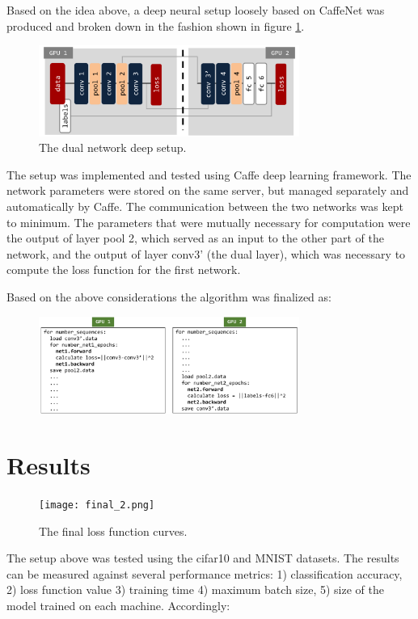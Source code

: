 \documentclass[conference]{IEEEtran}
\begin{document}
Based on the idea above, a deep neural setup loosely based on CaffeNet was produced and broken down in the fashion shown in figure \ref{net12separate}.

\begin{figure}[htp]
	\centerline{\includegraphics[width=3.35in]{net12separate}}
	\caption{The dual network deep setup.}
	\label{net12separate}
\end{figure}

The setup was implemented and tested using Caffe deep learning framework. The network parameters were stored on the same server, but managed separately and automatically by Caffe. The communication between the two networks was kept to minimum. The parameters that were mutually necessary for computation were the output of layer pool 2, which served as an input to the other part of the network, and the output of layer conv3' (the dual layer), which was necessary to compute the loss function for the first network.

Based on the above considerations the algorithm was finalized as:
\begin{figure}[htp]
	\centerline{\includegraphics[width=3.35in]{algocode_revisited}}
\end{figure}

\section{Results}

\begin{figure}[htp]
	\centerline{\texttt{[image: final\_2.png]}}
	\caption{The final loss function curves.}
	\label{final_2}
\end{figure}

The setup above was tested using the cifar10 and MNIST datasets. The results can be measured against several performance metrics: 1) classification accuracy, 2) loss function value 3) training time 4) maximum batch size, 5) size of the model trained on each machine. Accordingly:
\end{document}
